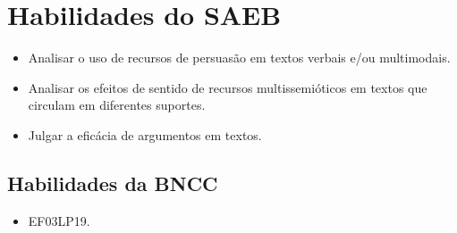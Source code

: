 \section*{Habilidades do SAEB}

\begin{itemize}
  \item Analisar o uso de recursos de persuasão em textos verbais e/ou
  multimodais.
  \item Analisar os efeitos de sentido de recursos multissemióticos em
  textos que circulam em diferentes suportes.
  \item Julgar a eficácia de argumentos em textos.
\end{itemize}

\subsection{Habilidades da BNCC}

\begin{itemize}
  \item EF03LP19.
\end{itemize}

